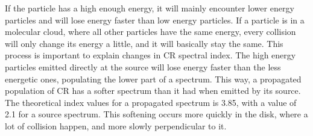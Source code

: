 If the particle has a high enough energy, it will mainly encounter lower energy particles and will lose energy faster than low energy particles. If a particle is in a molecular cloud, where all other particles have the same energy, every collision will only change its energy a little, and it will basically stay the same.
This process is important to explain changes in CR spectral index. The high energy particles emitted directly at the source will lose energy faster than the less energetic ones, populating the lower part of a spectrum. This way, a propagated population of CR has a softer spectrum than it had when emitted by its source. The theoretical index values for a propagated spectrum is 3.85, with a value of 2.1 for a source spectrum. \cite{Hillas2005}
This softening occurs more quickly in the disk, where a lot of collision happen, and more slowly perpendicular to it.

